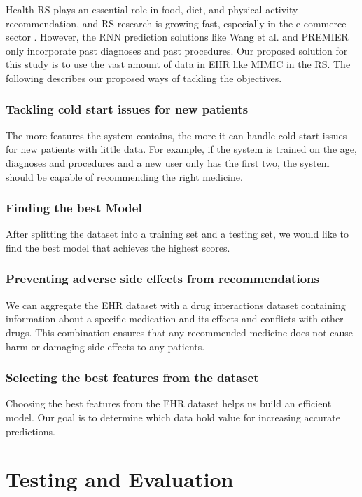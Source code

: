 \label{Proposed}

Health RS plays an essential role in food, diet, and physical activity
recommendation, and RS research is growing fast, especially in the e-commerce
sector \cite{Tran2021b}. However, the RNN prediction solutions
like Wang et al. \cite{Wang} and PREMIER \cite{Bhoi2021} only incorporate past diagnoses and past
procedures. Our proposed solution for this study is to use the vast amount of
data in EHR like MIMIC in the RS.  The following describes our proposed ways of
tackling the objectives.


\subsubsection{
    Tackling cold start issues for new patients
}

The more features the system contains, the more it can handle cold start issues
for new patients with little data. For example, if the system is trained on the
age, diagnoses and procedures and a new user only has the first two, the system
should be capable of recommending the right medicine. 

\subsubsection{
Finding the best Model
}
After splitting the dataset into a training set and a testing set, we would
like to find the best model that achieves the highest scores.

\subsubsection{
    Preventing adverse side effects from recommendations
}
We can aggregate the EHR dataset with a drug interactions dataset containing
information about a specific medication and its effects and conflicts with
other drugs. This combination ensures that any recommended medicine does not
cause harm or damaging side effects to any patients. 

\subsubsection{
    Selecting the best features from the dataset
}
Choosing the best features from the EHR dataset helps us build an efficient
model. Our goal is to determine which data hold value for increasing accurate
predictions.

\section{Testing and Evaluation}

